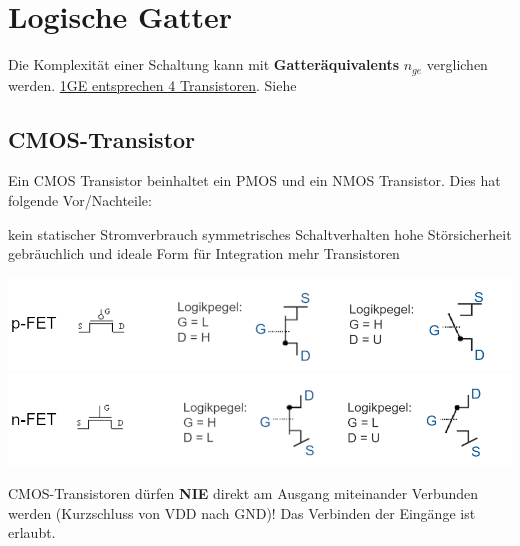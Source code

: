 \section{Logische Gatter}
Die Komplexität einer Schaltung kann mit \textbf{Gatteräquivalents} $n_{ge}$ verglichen werden. \underline{1GE entsprechen 4 Transistoren}. Siehe 

\subsection{CMOS-Transistor}
Ein CMOS Transistor beinhaltet ein PMOS und ein NMOS Transistor. Dies hat folgende Vor/Nachteile:
\begin{itemize}[nosep]
	\pro kein statischer Stromverbrauch 
	\pro symmetrisches Schaltverhalten
	\pro hohe Störsicherheit
	\pro gebräuchlich und ideale Form für Integration
	\contra mehr Transistoren
\end{itemize}

\noindent
\includegraphics[width=\columnwidth]{./Images/p-fet.png}
\includegraphics[width=\columnwidth]{./Images/n-fet.png}

\noindent
CMOS-Transistoren dürfen \textbf{NIE} direkt am Ausgang miteinander Verbunden werden (Kurzschluss von VDD nach GND)! Das Verbinden der Eingänge ist erlaubt.

